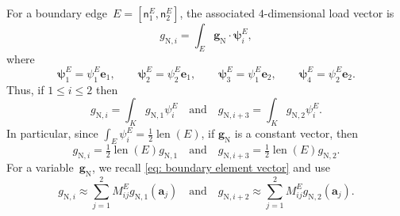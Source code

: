 \documentclass[a4paper,12pt]{article}
\newcommand{\bs}[1]{\boldsymbol{#1}}
\newcommand{\len}{\operatorname{len}}
\newcommand{\uN}{\mathrm{N}}
\begin{document}
For a boundary edge~$E=[\mathsf{n}^E_1,\mathsf{n}^E_2]$, the associated 
$4$-dimensional load vector is
\[
g_{\uN,i}=\int_E\bs{g}_{\uN}\cdot\bs{\psi}^E_i,
\]
where 
\[
\bs{\psi}^E_1=\psi^E_1\bs{e}_1,\qquad
\bs{\psi}^E_2=\psi^E_2\bs{e}_1,\qquad
\bs{\psi}^E_3=\psi^E_1\bs{e}_2,\qquad
\bs{\psi}^E_4=\psi^E_2\bs{e}_2.
\]
Thus, if $1\le i\le2$ then
\[
g_{\uN,i}=\int_Kg_{\uN,1}\psi^E_i\quad\text{and}\quad
g_{\uN,i+3}=\int_Kg_{\uN,2}\psi^E_i.
\]
In particular, since $\int_E\psi^E_i=\tfrac12\len(E)$, if $\bs{g}_{\uN}$ is a 
constant vector, then
\[
g_{\uN,i}=\tfrac12\len(E)g_{\uN,1}
\quad\text{and}\quad
g_{\uN,i+3}=\tfrac12\len(E)g_{\uN,2}.
\]
For a variable~$\bs{g}_{\uN}$, we recall \eqref{eq: boundary element vector}
and use
\[
g_{\uN,i}\approx\sum_{j=1}^2M^E_{ij}g_{\uN,1}(\bs{a}_j)
\quad\text{and}\quad
g_{\uN,i+2}\approx\sum_{j=1}^2M^E_{ij}g_{\uN,2}(\bs{a}_j).
\]
\end{document}
